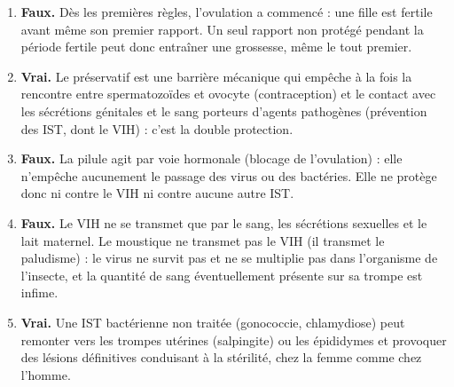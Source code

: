 \documentclass[11pt]{article}
\newcommand{\cle}[1]{{\popxbold\color{popdark}#1}}
\begin{document}
\begin{corrige}
\begin{enumerate}
\item \textbf{Faux.} Dès les premières règles, l'ovulation a commencé : une fille est fertile avant même son premier rapport. Un seul rapport non protégé pendant la période fertile peut donc entraîner une grossesse, même le tout premier.
\item \textbf{Vrai.} Le préservatif est une barrière mécanique qui empêche à la fois la rencontre entre spermatozoïdes et ovocyte (contraception) et le contact avec les sécrétions génitales et le sang porteurs d'agents pathogènes (prévention des IST, dont le VIH) : c'est la \cle{double protection}.
\item \textbf{Faux.} La pilule agit par voie hormonale (blocage de l'ovulation) : elle n'empêche aucunement le passage des virus ou des bactéries. Elle ne protège donc ni contre le VIH ni contre aucune autre IST.
\item \textbf{Faux.} Le VIH ne se transmet que par le sang, les sécrétions sexuelles et le lait maternel. Le moustique ne transmet pas le VIH (il transmet le paludisme) : le virus ne survit pas et ne se multiplie pas dans l'organisme de l'insecte, et la quantité de sang éventuellement présente sur sa trompe est infime.
\item \textbf{Vrai.} Une IST bactérienne non traitée (gonococcie, chlamydiose) peut remonter vers les trompes utérines (salpingite) ou les épididymes et provoquer des lésions définitives conduisant à la stérilité, chez la femme comme chez l'homme.
\end{enumerate}
\end{corrige}
\end{document}
